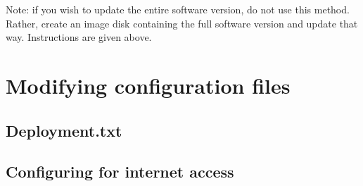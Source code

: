 \documentclass[
]{book}
\begin{document}
Note: if you wish to update the entire software version, do not use this method. Rather, create an image disk containing the full software version and update that way. Instructions are given above.

\hypertarget{modifying-configuration-files}{%
\chapter{Modifying configuration files}\label{modifying-configuration-files}}

\hypertarget{deployment.txt}{%
\section{Deployment.txt}\label{deployment.txt}}

\hypertarget{configuring-for-internet-access}{%
\section{Configuring for internet access}\label{configuring-for-internet-access}}

  
\end{document}
